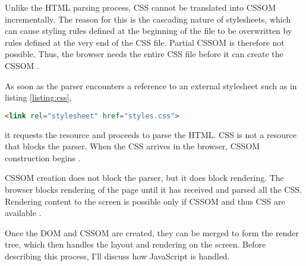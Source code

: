 
Unlike the HTML parsing process, CSS cannot be translated into CSSOM incrementally.
The reason for this is the cascading nature of stylesheets, which can cause styling rules defined at the beginning of the file to be overwritten by rules defined at the very end of the CSS file.
Partial CSSOM is therefore not possible.
Thus, the browser needs the entire CSS file before it can create the CSSOM \cite{2021MDNCRP}.



As soon as the parser encounters a reference to an external stylesheet such as in listing \ref{listing:css},

\begin{center}
\begin{lstlisting}[caption={Link to a CSS file from the main document}, label={listing:css}, language=html, numbers=none]
<link rel="stylesheet" href="styles.css">
\end{lstlisting}
\end{center}

it requests the resource and proceeds to parse the HTML.
CSS is not a resource that blocks the parser.
When the CSS arrives in the browser, CSSOM construction begins \cite{2021Ohans}.




CSSOM creation does not block the parser, but it does block rendering.
The browser blocks rendering of the page until it has received and parsed all the CSS.
Rendering content to the screen is possible only if CSSOM and thus CSS are available \cite{2019GrigorikCSS}.



Once the DOM and CSSOM are created, they can be merged to form the render tree, which then handles the layout and rendering on the screen.
Before describing this process, I'll discuss how JavaScript is handled.





